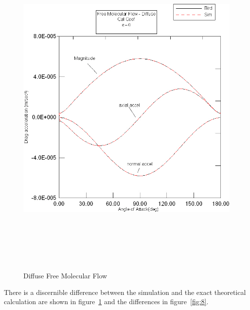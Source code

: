 \begin{description}
\begin{figure}[hbpt]
\includegraphics [height=175mm]{figs/diffuse_cc.jpg}
\caption{Diffuse Free Molecular Flow}
\label{fig:7}
\end{figure}
There is a discernible difference between the simulation and the exact
theoretical calculation are shown in figure~\ref{fig:7} and the
differences in figure~\ref{fig:8}.
\begin{figure}[hbpt]

\end{figure}
\end{description}
